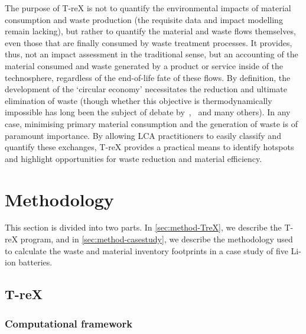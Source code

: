 \documentclass[a4paper,fleqn]{cas-dc}
\begin{document}
The purpose of T-reX is not to quantify the environmental impacts of material consumption and waste production (the requisite data and impact modelling remain lacking), but rather to quantify the material and waste flows themselves, even those that are finally consumed by waste treatment processes. It provides, thus, not an impact assessment in the traditional sense, but an accounting of the material consumed and waste generated by a product or service inside of the technosphere, regardless of the end-of-life fate of these flows. By definition, the development of the `circular economy' necessitates the reduction and ultimate elimination of waste (though whether this objective is thermodynamically impossible has long been the subject of debate by~\cite{ayres1998recycling},~\cite{reuter2012recyclinglimits} and many others). In any case, minimising primary material consumption and the generation of waste is of paramount importance. By allowing LCA practitioners to easily classify and quantify these exchanges, T-reX provides a practical means to identify hotspots and highlight opportunities for waste reduction and material efficiency.



\section{Methodology}\label{sec:methodology}

This section is divided into two parts. In \autoref{sec:method-TreX}, we describe the T-reX program, and in \autoref{sec:method-casestudy}, we describe the methodology used to calculate the waste and material inventory footprints in a case study of five Li-ion batteries.

\subsection{T-reX}\label{sec:method-TreX}

\subsubsection{Computational framework}
\end{document}
